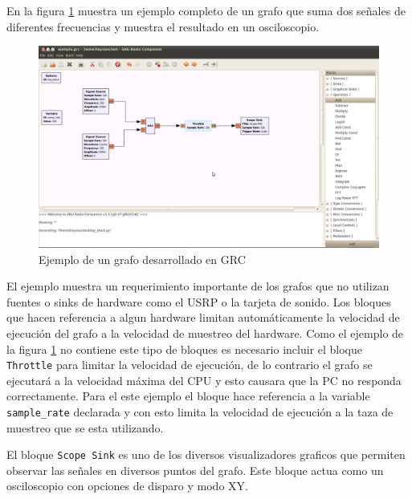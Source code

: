 En la figura \ref{fig:grcex} muestra un ejemplo completo de un grafo que suma dos se\~nales de
diferentes frecuencias y muestra el resultado en un osciloscopio.

\begin{figure}[tp]
  \centering
  \includegraphics[width=5.5in]{figs/grc6}
  \vspace{0.3in}
  \caption{Ejemplo de un grafo desarrollado en GRC}
  \label{fig:grcex}
\end{figure}

El ejemplo muestra un requerimiento importante de los grafos que no utilizan fuentes o sinks de
hardware como el USRP o la tarjeta de sonido. Los bloques que hacen referencia a algun hardware
limitan autom\'aticamente la velocidad de ejecuci\'on del grafo a la velocidad de muestreo del
hardware. Como el ejemplo de la figura \ref{fig:grcex} no contiene este tipo de bloques es
necesario incluir el bloque \verb|Throttle| para limitar la velocidad de ejecuci\'on, de lo
contrario el grafo se ejecutar\'a a la velocidad m\'axima del CPU y esto causara que la PC no
responda correctamente. Para el este ejemplo el bloque hace referencia a la variable
\verb|sample_rate| declarada y con esto limita la velocidad de ejecuci\'on a la taza de muestreo que
se esta utilizando.

El bloque \verb|Scope Sink| es uno de los diversos visualizadores graficos que permiten observar las
se\~nales en diversos puntos del grafo. Este bloque actua como un osciloscopio con opciones de
disparo y modo XY.